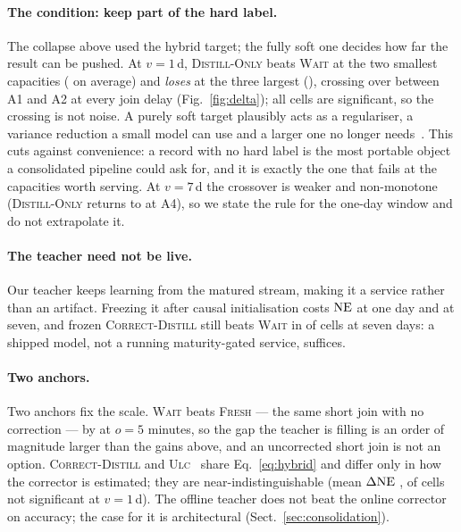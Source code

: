 \paragraph{The condition: keep part of the hard label.}
The collapse above used the hybrid target; the fully soft one decides how far the result can be
pushed. At $v=1$\,d, \textsc{Distill-Only} beats
\textsc{Wait} at the two smallest capacities (\doSmall{} on average) and \emph{loses} at the
three largest (\doLarge{}), crossing over between A1 and A2 at every join delay
(Fig.~\ref{fig:delta}); all \doSig{} cells are significant, so the crossing is not noise. A purely soft target plausibly acts as a regulariser, a variance reduction a small model can
use and a larger one no longer needs~\cite{menon2021statistical}. This cuts against
convenience: a record with no hard label is the most portable object a consolidated pipeline
could ask for, and it is exactly the one that fails at the capacities worth serving. At $v=7$\,d the crossover is weaker and
non-monotone (\textsc{Distill-Only} returns to \doSevenLargest{} at A4), so we state the rule
for the one-day window and do not extrapolate it.

\paragraph{The teacher need not be live.}
Our teacher keeps learning from the matured stream, making it a service rather than an
artifact. Freezing it after causal initialisation costs \frzOne{} $\mathrm{NE}$ at one day and
\frzSeven{} at seven, and frozen \textsc{Correct-Distill} still beats \textsc{Wait} in
\frzSevenBeat{} of \frzSevenN{} cells at seven days: a shipped model, not a running
maturity-gated service, suffices.

\paragraph{Two anchors.}
Two anchors fix the scale. \textsc{Wait} beats \textsc{Fresh} --- the same short join with no
correction --- by \waitFreshFive{} at $o=5$ minutes, so the gap the teacher is filling is an
order of magnitude larger than the gains above, and an uncorrected short join is not an option.
\textsc{Correct-Distill} and \textsc{Ulc}~\cite{wang2023unbiased} share Eq.~\eqref{eq:hybrid}
and differ only in how the corrector is estimated; they are near-indistinguishable (mean $\Delta\mathrm{NE}$ \cdUlcMean{}, \cdUlcNs{} of \nContrast{} cells
not significant at $v=1$\,d). The offline teacher does not beat the online corrector on
accuracy; the case for it is architectural (Sect.~\ref{sec:consolidation}).
